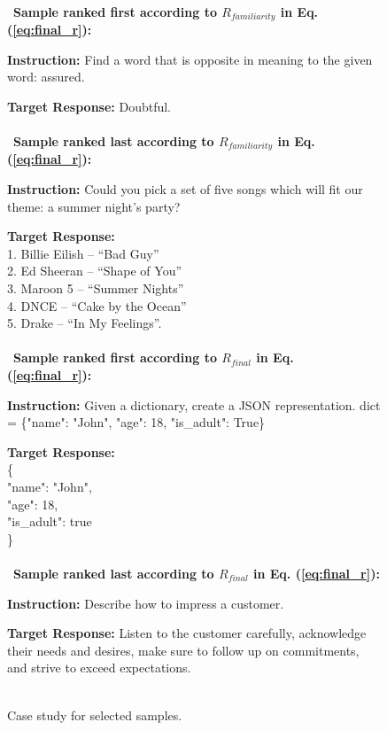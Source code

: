 \newpage
\begin{figure*} 
    \centering
    \begin{tcolorbox}[title = {Case Study for Selected Samples}, size=title, colframe = white, colbacktitle = black!65!white]
    \noindent
    \

    \faLaughBeam~\textbf{Sample ranked first according to $R_{familiarity}$ in Eq. (\ref{eq:final_r}):}
    
    \textbf{Instruction:} Find a word that is opposite in meaning to the given word: assured.
    
    \textbf{Target Response:} Doubtful. \\ \\

    \faFrown~\textbf{Sample ranked last according to $R_{familiarity}$ in Eq. (\ref{eq:final_r}):}
    
    \textbf{Instruction:} Could you pick a set of five songs which will fit our theme: a summer night's party?
    
    \textbf{Target Response:} \\ 1. Billie Eilish – “Bad Guy” \\ 2. Ed Sheeran – “Shape of You” \\ 3. Maroon 5 – “Summer Nights” \\ 4. DNCE – “Cake by the Ocean” \\ 5. Drake – “In My Feelings”. \\ \\
    
    \faLaughBeam~\textbf{Sample ranked first according to $R_{final}$ in Eq. (\ref{eq:final_r}):}
    
    \textbf{Instruction:} Given a dictionary, create a JSON representation. dict = \{"name": "John", "age": 18, "is\_adult": True\}
    
    \textbf{Target Response:} \\ \{\\ \quad "name": "John", \\ "age": 18, \\ \quad "is\_adult": true \\ \} \\ \\

    \faFrown~\textbf{Sample ranked last according to $R_{final}$ in Eq. (\ref{eq:final_r}): }
    
    \textbf{Instruction:} Describe how to impress a customer.
    
    \textbf{Target Response:} Listen to the customer carefully, acknowledge their needs and desires, make sure to follow up on commitments, and strive to exceed expectations. \\ \\


    \end{tcolorbox}
    \caption{Case study for selected samples.}
    \label{fig:casestudy}
\end{figure*}